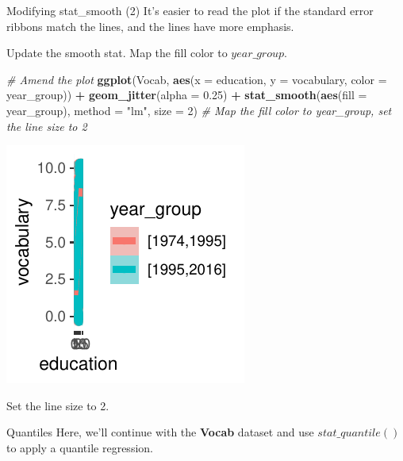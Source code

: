 \documentclass[
  ignorenonframetext,
]{beamer}
\newenvironment{Shaded}{\begin{snugshade}}{\end{snugshade}}
\newcommand{\AttributeTok}[1]{\textcolor[rgb]{0.13,0.29,0.53}{#1}}
\newcommand{\CommentTok}[1]{\textcolor[rgb]{0.56,0.35,0.01}{\textit{#1}}}
\newcommand{\DecValTok}[1]{\textcolor[rgb]{0.00,0.00,0.81}{#1}}
\newcommand{\FloatTok}[1]{\textcolor[rgb]{0.00,0.00,0.81}{#1}}
\newcommand{\FunctionTok}[1]{\textcolor[rgb]{0.13,0.29,0.53}{\textbf{#1}}}
\newcommand{\NormalTok}[1]{#1}
\newcommand{\SpecialCharTok}[1]{\textcolor[rgb]{0.81,0.36,0.00}{\textbf{#1}}}
\newcommand{\StringTok}[1]{\textcolor[rgb]{0.31,0.60,0.02}{#1}}
\begin{document}
\begin{frame}[fragile]{Modifying stat\_smooth (2)}
\label{modifying-stat_smooth-2-4}
It's easier to read the plot if the standard error ribbons match the
lines, and the lines have more emphasis.

Update the smooth stat. Map the fill color to \(year\_group\).


\begin{Shaded}
\begin{Highlighting}[]
\CommentTok{\# Amend the plot}
\FunctionTok{ggplot}\NormalTok{(Vocab, }\FunctionTok{aes}\NormalTok{(}\AttributeTok{x =}\NormalTok{ education, }\AttributeTok{y =}\NormalTok{ vocabulary, }\AttributeTok{color =}\NormalTok{ year\_group)) }\SpecialCharTok{+}
    \FunctionTok{geom\_jitter}\NormalTok{(}\AttributeTok{alpha =} \FloatTok{0.25}\NormalTok{) }\SpecialCharTok{+} \FunctionTok{stat\_smooth}\NormalTok{(}\FunctionTok{aes}\NormalTok{(}\AttributeTok{fill =}\NormalTok{ year\_group),}
    \AttributeTok{method =} \StringTok{"lm"}\NormalTok{, }\AttributeTok{size =} \DecValTok{2}\NormalTok{)  }\CommentTok{\# Map the fill color to year\_group, set the line size to 2}
\end{Highlighting}
\end{Shaded}

\begin{center}\includegraphics[width=0.5\linewidth]{Figs/unnamed-chunk-17-1} \end{center}

Set the line size to 2.
\end{frame}

\begin{frame}{Quantiles}
\label{quantiles}
Here, we'll continue with the \textbf{Vocab} dataset and use
\(stat\_quantile()\) to apply a quantile regression.
\end{frame}
\end{document}
